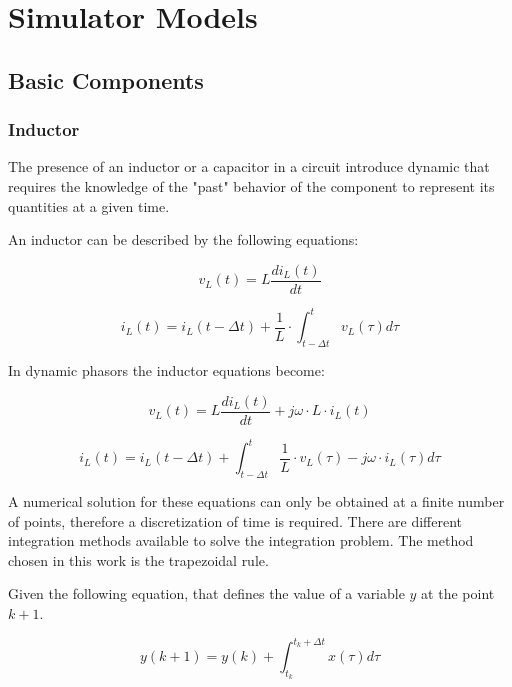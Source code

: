 \chapter{Simulator Models}

\section{Basic Components}

\subsection{Inductor}

The presence of an inductor or a capacitor in a circuit introduce dynamic that requires the knowledge of the "past" behavior of the component to represent its quantities at a given time.

An inductor can be described by the following equations: 

\begin{equation}
        v_L(t) = L \frac{di_L(t)}{dt}
\end{equation}

\begin{equation}
        i_L(t) = i_L(t- \Delta t) + \frac{1}{L} \cdot \int_{t- \Delta t}^{t} v_L(\tau) d \tau 
\end{equation}

In dynamic phasors the inductor equations become:

\begin{equation}
        v_L(t) = L \frac{di_L(t)}{dt} + j \omega \cdot L \cdot  i_L(t)
\end{equation}

\begin{equation}
        i_L(t) = i_L(t- \Delta t) +  \int_{t- \Delta t}^{t} \frac{1}{L} \cdot v_L(\tau) -j \omega \cdot i_L(\tau)d \tau 
\end{equation}

A numerical solution for these equations can only be obtained at a finite number of points, therefore a discretization of time is required.
There are different integration methods available to solve the integration problem. The method chosen in this work is the trapezoidal rule.

Given the following equation, that defines the value of a variable $y$ at the point $k+1$.

\begin{equation}
	y(k+1) = y(k) + \int_{t_k}^{t_k+ \Delta t} x(\tau)d \tau
\end{equation}


